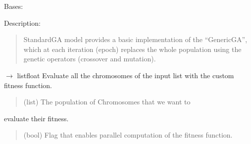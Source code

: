 \documentclass[letterpaper,10pt,english]{sphinxmanual}
\begin{document}
\begin{fulllineitems}
\label{\detokenize{pygenalgo.engines:pygenalgo.engines.standard_ga.StandardGA}}
\pysigstartsignatures
\pysiglinewithargsret
{}
{}
{}
\pysigstopsignatures
\sphinxAtStartPar
Bases: {\hyperref[\detokenize{pygenalgo.engines:pygenalgo.engines.generic_ga.GenericGA}]{}}

\sphinxAtStartPar
Description:
\begin{quote}

\sphinxAtStartPar
StandardGA model provides a basic implementation of the “GenericGA”,
which at each iteration (epoch) replaces the whole population using
the genetic operators (crossover and mutation).
\end{quote}

\begin{fulllineitems}
\label{\detokenize{pygenalgo.engines:pygenalgo.engines.standard_ga.StandardGA.evaluate_fitness}}
\pysigstartsignatures
\pysiglinewithargsret
{}
{\sphinxparamcomma {}}
{{ $\rightarrow$ list\DUrole{p}{{[}}float\DUrole{p}{{]}}}}
\pysigstopsignatures
\sphinxAtStartPar
Evaluate all the chromosomes of the input list with the custom fitness function.
\begin{quote}\begin{description}
\sphinxAtStartPar
{} \textendash{} (list) The population of Chromosomes that we want to

\end{description}\end{quote}

\sphinxAtStartPar
evaluate their fitness.
\begin{quote}\begin{description}
\sphinxAtStartPar
{} \textendash{} (bool) Flag that enables parallel computation of the fitness function.


\end{description}
\end{quote}
\end{fulllineitems}
\end{fulllineitems}
\end{document}
